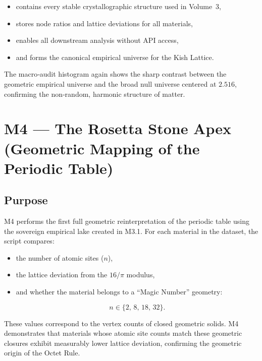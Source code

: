 \documentclass[11pt, letterpaper, openany]{book}
\begin{document}
\begin{itemize}
    \item contains every stable crystallographic structure used in Volume~3,
    \item stores node ratios and lattice deviations for all materials,
    \item enables all downstream analysis without API access,
    \item and forms the canonical empirical universe for the Kish Lattice.
\end{itemize}

The macro‑audit histogram again shows the sharp contrast between the geometric
empirical universe and the broad null universe centered at $2.516$, confirming
the non‑random, harmonic structure of matter.


\section{M4 — The Rosetta Stone Apex (Geometric Mapping of the Periodic Table)}

\subsection*{Purpose}
M4 performs the first full geometric reinterpretation of the periodic table using
the sovereign empirical lake created in M3.1. For each material in the dataset,
the script compares:

\begin{itemize}
    \item the number of atomic sites ($n$),
    \item the lattice deviation from the $16/\pi$ modulus,
    \item and whether the material belongs to a ``Magic Number'' geometry:
          

\[
              n \in \{2,\, 8,\, 18,\, 32\}.
          \]


\end{itemize}

These values correspond to the vertex counts of closed geometric solids.  
M4 demonstrates that materials whose atomic site counts match these geometric
closures exhibit measurably lower lattice deviation, confirming the geometric
origin of the Octet Rule.
\end{document}
